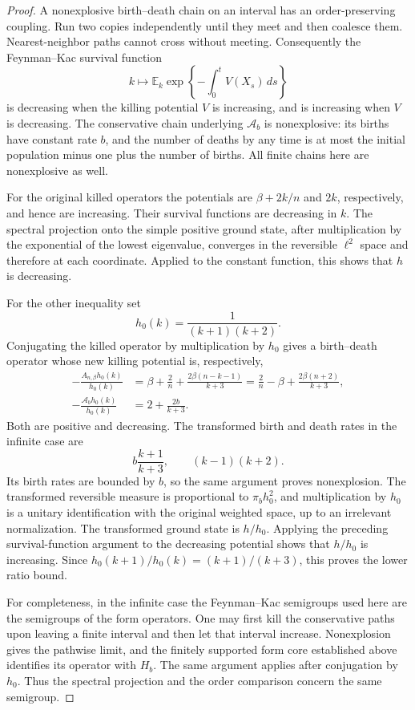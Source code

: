 \begin{proof}
A nonexplosive birth--death chain on an interval has an order-preserving
coupling.  Run two copies independently until they meet and then
coalesce them.  Nearest-neighbor paths cannot cross without meeting.
Consequently the Feynman--Kac survival function
\[
 k\longmapsto
 \mathbb E_k\exp\left\{-\int_0^t V(X_s)\,ds\right\}
\]
is decreasing when the killing potential $V$ is increasing, and is
increasing when $V$ is decreasing.  The conservative chain underlying
$\mathcal A_b$ is nonexplosive: its births have constant rate $b$, and
the number of deaths by any time is at most the initial population
minus one plus the number of births.  All finite chains here are
nonexplosive as well.

For the original killed operators the potentials are $\beta+2k/n$ and
$2k$, respectively, and hence are increasing.  Their survival functions
are decreasing in $k$.  The spectral projection onto the simple
positive ground state, after multiplication by the exponential of the
lowest eigenvalue, converges in the reversible $\ell^2$ space and
therefore at each coordinate.  Applied to the constant function, this
shows that $h$ is decreasing.

For the other inequality set
\[
 h_0(k)=\frac1{(k+1)(k+2)}.
\]
Conjugating the killed operator by multiplication by $h_0$ gives a
birth--death operator whose new killing potential is, respectively,
\begin{equation}\label{eq:critical-transform-potentials}
 \begin{split}
 -\frac{A_{n,\beta}h_0(k)}{h_0(k)}
 &=\beta+\frac2n+\frac{2\beta(n-k-1)}{k+3}
   =\frac2n-\beta+\frac{2\beta(n+2)}{k+3},\\
 -\frac{\mathcal A_bh_0(k)}{h_0(k)}
 &=2+\frac{2b}{k+3}.
 \end{split}
\end{equation}
Both are positive and decreasing.  The transformed birth and death
rates in the infinite case are
\[
 b\frac{k+1}{k+3},\qquad (k-1)(k+2).
\]
Its birth rates are bounded by $b$, so the same argument proves
nonexplosion.  The transformed reversible measure is proportional to
$\pi_b h_0^2$, and multiplication by $h_0$ is a unitary identification
with the original weighted space, up to an irrelevant normalization.
The transformed ground state is $h/h_0$.  Applying the preceding
survival-function argument to the decreasing potential shows that
$h/h_0$ is increasing.  Since
$h_0(k+1)/h_0(k)=(k+1)/(k+3)$, this proves the lower ratio bound.

For completeness, in the infinite case the Feynman--Kac semigroups
used here are the semigroups of the form operators.  One may first kill
the conservative paths upon leaving a finite interval and then let
that interval increase.  Nonexplosion gives the pathwise limit, and
the finitely supported form core established above identifies its
operator with $H_b$.  The same argument applies after conjugation by
$h_0$.  Thus the spectral projection and the order comparison concern
the same semigroup.
\end{proof}

